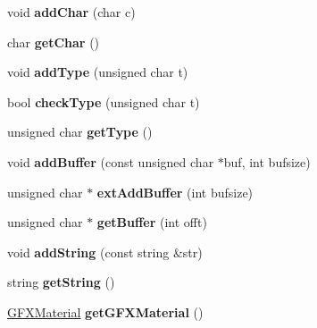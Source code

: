 \begin{DoxyCompactItemize}
\item 
void {\bfseries add\+Char} (char c)\hypertarget{classNetBuffer_afefd6e80995d63a5569c8f3af3dc5218}{}\label{classNetBuffer_afefd6e80995d63a5569c8f3af3dc5218}

\item 
char {\bfseries get\+Char} ()\hypertarget{classNetBuffer_ad93cb4a5a21c6a655b8e3e9f23ed250a}{}\label{classNetBuffer_ad93cb4a5a21c6a655b8e3e9f23ed250a}

\item 
void {\bfseries add\+Type} (unsigned char t)\hypertarget{classNetBuffer_aedf3747afe7b154d3ea6ddad36eedd5a}{}\label{classNetBuffer_aedf3747afe7b154d3ea6ddad36eedd5a}

\item 
bool {\bfseries check\+Type} (unsigned char t)\hypertarget{classNetBuffer_a0ad0d69163cb5e58646b91372c493564}{}\label{classNetBuffer_a0ad0d69163cb5e58646b91372c493564}

\item 
unsigned char {\bfseries get\+Type} ()\hypertarget{classNetBuffer_a1725ac740cebc7fa2bea789fda734d17}{}\label{classNetBuffer_a1725ac740cebc7fa2bea789fda734d17}

\item 
void {\bfseries add\+Buffer} (const unsigned char $\ast$buf, int bufsize)\hypertarget{classNetBuffer_ac91c16d31d08db4a4e437a3301c3c1de}{}\label{classNetBuffer_ac91c16d31d08db4a4e437a3301c3c1de}

\item 
unsigned char $\ast$ {\bfseries ext\+Add\+Buffer} (int bufsize)\hypertarget{classNetBuffer_aa657ec9a2903dafc7538f29a325630ce}{}\label{classNetBuffer_aa657ec9a2903dafc7538f29a325630ce}

\item 
unsigned char $\ast$ {\bfseries get\+Buffer} (int offt)\hypertarget{classNetBuffer_a0bf475e835b2b8d9f5d9a5553c3e0a45}{}\label{classNetBuffer_a0bf475e835b2b8d9f5d9a5553c3e0a45}

\item 
void {\bfseries add\+String} (const string \&str)\hypertarget{classNetBuffer_a04877f36950f426cdddac031d2882c26}{}\label{classNetBuffer_a04877f36950f426cdddac031d2882c26}

\item 
string {\bfseries get\+String} ()\hypertarget{classNetBuffer_a0a9e31eb20e1c312dda8c3378a130b16}{}\label{classNetBuffer_a0a9e31eb20e1c312dda8c3378a130b16}

\item 
\hyperlink{structGFXMaterial}{G\+F\+X\+Material} {\bfseries get\+G\+F\+X\+Material} ()\hypertarget{classNetBuffer_a421fdf3cbb9ce7116f23b2e06fe741cf}{}\label{classNetBuffer_a421fdf3cbb9ce7116f23b2e06fe741cf}


\end{DoxyCompactItemize}
